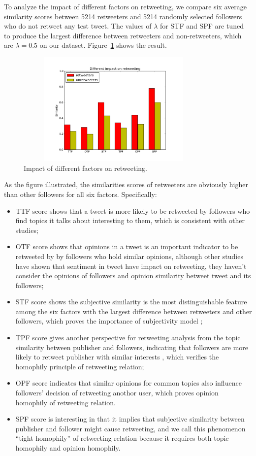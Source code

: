 \documentclass[smallcondensed]{svjour3}     %
\begin{document}
To analyze the impact of different factors on retweeting, we compare six average similarity scores between 5214 retweeters and 5214 randomly selected followers who do not retweet any test tweet. The values of $ \lambda $ for STF and SPF are tuned to produce the largest difference between retweeters and non-retweeters, which are $ \lambda =0.5 $ on our dataset. Figure~\ref{fig:graph6} shows the result.
\begin{figure}[htb]
\centering
\includegraphics[width=3.8in,height=2.2in]{component.pdf}
\vspace{-2em}
\caption{Impact of different factors on retweeting.}
\label{fig:graph6}
\end{figure}
As the figure illustrated, the similarities scores of retweeters are obviously higher than other followers for all six factors. Specifically: 
\begin{itemize}
\item TTF score shows that a tweet is more likely to be retweeted by followers who find topics it talks about interesting to them, which is consistent with other studies\cite{conf/icwsm/MacskassyM11, conf/wsdm/FengW13};
\item OTF score shows that opinions in a tweet is an important indicator to be retweeted by by followers who hold similar opinions, although other studies\cite{conf/icwsm/PfitznerGS12,2011:NaveedGKC} have shown that sentiment in tweet have impact on retweeting, they haven't consider the opinions of followers and opinion similarity betweet tweet and its followers;
\item STF score shows the subjective similarity is the most distinguishable feature among the six factors with the largest difference between retweeters and other followers, which proves the importance of subjectivity model ;
\item TPF score gives another perspective for retweeting analysis from the topic similarity between publisher and followers, indicating that followers are more likely to retweet publisher with similar interests , which verifies the homophily principle of retweeting relation;
\item OPF score indicates that similar opinions for common topics also influence followers' decision of retweeting anothor user, which proves opinion homophily of retweeting relation.
\item SPF score is interesting in that it implies that subjective similarity between publisher and follower might cause retweeting, and we call this phenomenon ``tight homophily'' of retweeting relation because it requires both topic homophily and opinion homophily.
\end{itemize} 
\end{document}
